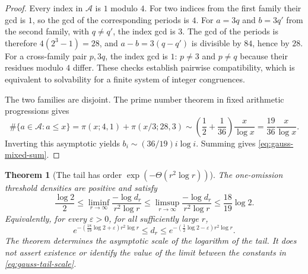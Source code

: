\documentclass[11pt,a4paper]{article}
\newtheorem{theorem}{Theorem}[section]
\theoremstyle{definition}
\theoremstyle{remark}\newtheorem{remark}[theorem]{Remark}
\begin{document}
\begin{proof}
Every index in $\mathcal A$ is $1$ modulo $4$.  For two indices from
the first family their gcd is $1$, so the gcd of the corresponding
periods is $4$.  For $a=3q$ and $b=3q'$ from the second family, with
$q\ne q'$, the index gcd is $3$.  The gcd of the periods is therefore
$4(2^3-1)=28$, and $a-b=3(q-q')$ is divisible by $84$, hence by
$28$.  For a cross-family pair $p,3q$, the index gcd is $1$:
$p\ne3$ and $p\not=q$ because their residues modulo $4$ differ.
These checks establish pairwise compatibility, which is equivalent
to solvability for a finite system of integer congruences.

The two families are disjoint.  The prime number theorem in fixed
arithmetic progressions gives
\[
 \#\{a\in\mathcal A:a\leq x\}
 =\pi(x;4,1)+\pi(x/3;28,3)
 \sim\left(\frac12+\frac1{36}\right)\frac{x}{\log x}
 =\frac{19}{36}\frac{x}{\log x}.
\]
Inverting this asymptotic yields
$b_i\sim(36/19)i\log i$.  Summing gives
\eqref{eq:gauss-mixed-sum}.
\end{proof}

\begin{theorem}[The tail has order $\exp(-\Theta(r^2\log r))$]
\label{thm:omission-tail-scale}
The one-omission threshold densities are positive and satisfy
\begin{equation}\label{eq:gauss-tail-scale}
 \frac{\log2}{2}
 \leq\liminf_{r\to\infty}\frac{-\log d_r}{r^2\log r}
 \leq\limsup_{r\to\infty}\frac{-\log d_r}{r^2\log r}
 \leq\frac{18}{19}\log2.
\end{equation}
Equivalently, for every $\varepsilon>0$, for all sufficiently large $r$,
\[
 e^{-(\frac{18}{19}\log2+\varepsilon)r^2\log r}
 \leq d_r
 \leq e^{-(\frac12\log2-\varepsilon)r^2\log r}.
\]
The theorem determines the asymptotic scale of the logarithm of the
tail.  It does not assert existence or identify the value of the limit
between the constants in \eqref{eq:gauss-tail-scale}.
\end{theorem}
\end{document}
